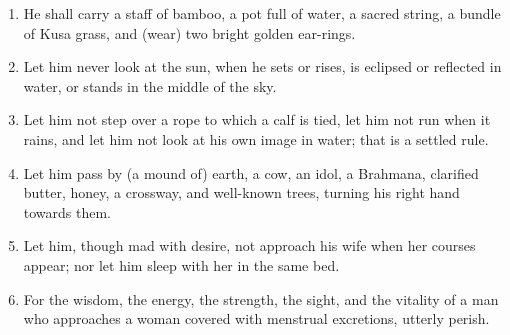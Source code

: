 \begin{enumerate}
\item He shall carry a staff of bamboo, a pot full of water, a sacred string, a bundle of Kusa grass, and (wear) two bright golden ear-rings.
\item Let him never look at the sun, when he sets or rises, is eclipsed or reflected in water, or stands in the middle of the sky.
\item Let him not step over a rope to which a calf is tied, let him not run when it rains, and let him not look at his own image in water; that is a settled rule.
\item Let him pass by (a mound of) earth, a cow, an idol, a Brahmana, clarified butter, honey, a crossway, and well-known trees, turning his right hand towards them.
\item Let him, though mad with desire, not approach his wife when her courses appear; nor let him sleep with her in the same bed.
\item For the wisdom, the energy, the strength, the sight, and the vitality of a man who approaches a woman covered with menstrual excretions, utterly perish.
\end{enumerate}
